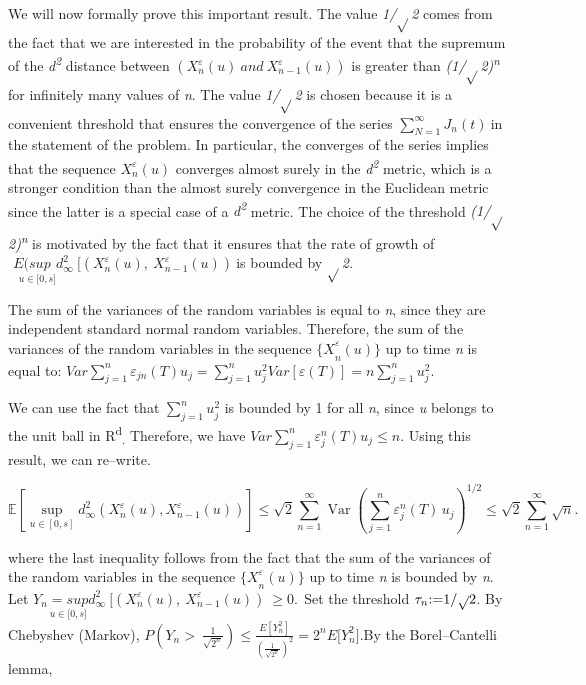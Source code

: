 \documentclass[12pt,a4paper]{report}
\numberwithin{equation}{section}
\begin{document}
We will now formally prove this important result. The value \emph{1/$\sqrt{}$2}
comes from the fact that we are interested in the probability of the
event that the supremum of the \emph{d\textsuperscript{2}} distance
between
\(\left( X_{n}^{\varepsilon}(u)\ and\ X_{n - 1}^{\varepsilon}(u) \right)\)
is greater than \emph{(1/$\sqrt{}$2)\textsuperscript{n}} for infinitely many
values of \emph{n}. The value \emph{1/$\sqrt{}$2} is chosen because it is a
convenient threshold that ensures the convergence of the series
\(\sum_{N = 1}^{\infty}{J_{n}(t)}\ \)in the statement of the problem. In
particular, the converges of the series implies that the sequence
\(X_{n}^{\varepsilon}(u)\) converges almost surely in the
\emph{d\textsuperscript{2}} metric, which is a stronger condition than
the almost surely convergence in the Euclidean metric since the latter
is a special case of a \emph{d\textsuperscript{2}} metric. The choice of
the threshold \emph{(1/$\sqrt{}$2)\textsuperscript{n}} is motivated by the fact
that it ensures that the rate of growth of
\(\underset{\ \ \ \ \ u \in \lbrack 0,s\rbrack}{E(sup}{d_{\infty}^{2}\ \lbrack\left( X_{n}^{\varepsilon}(u),\ X_{n - 1}^{\varepsilon}(u) \right)\ }\)is
bounded by \emph{$\sqrt{}$2.} 

The sum of the variances of the random variables is equal to \emph{n},
since they are independent standard normal random variables. Therefore,
the sum of the variances of the random variables in the sequence
\({\{ X}_{n}^{\varepsilon}(u)\}\) up to time \emph{n} is equal to:
\(Var\sum_{j = 1}^{n}{\varepsilon_{jn}(T)u_{j} = \sum_{j = 1}^{n}u_{j}^{2}Var\left\lbrack \varepsilon(T) \right\rbrack = n\sum_{j = 1}^{n}u_{j}^{2}}\).

We can use the fact that \(\sum_{j = 1}^{n}u_{j}^{2}\) is bounded by 1
for all \emph{n}, since \emph{u} belongs to the unit ball in
R\textsuperscript{d}\textsubscript{.} Therefore, we have
\(Var\sum_{j = 1}^{n}{\varepsilon_{j}^{n}(T)u_{j} \leq n}\). Using this
result, we can re--write.

\[
\mathbb{E}\!\left[\sup_{u\in[0,s]}
d_{\infty}^{2}\!\left(X_{n}^{\varepsilon}(u),X_{n-1}^{\varepsilon}(u)\right)\right]
\le \sqrt{2}\sum_{n=1}^{\infty}
\operatorname{Var}\!\left(\sum_{j=1}^{n}\varepsilon_{j}^{n}(T)\,u_{j}\right)^{1/2}
\le \sqrt{2}\sum_{n=1}^{\infty}\sqrt{n}.
\]


where the last inequality follows from the fact that the sum of the
variances of the random variables in the sequence
\({\{ X}_{n}^{\varepsilon}(u)\}\) up to time \emph{n} is bounded by
\emph{n}.\\ Let
\(\underset{\ \ \ \ \ \ \ u \in \lbrack 0,s\rbrack}{Y_{n} = sup}{d_{\infty}^{2}\ \lbrack\left( X_{n}^{\varepsilon}(u),\ X_{n - 1}^{\varepsilon}(u) \right)\  \geq 0.\ }\ \)Set
the threshold \(\tau_{n} $:=$ 1/\sqrt{}2\). By Chebyshev (Markov),
\(P\left( Y_{n} > \ \frac{1}{\sqrt{2^{n}}} \right) \leq \frac{E\left\lbrack Y_{n}^{2} \right\rbrack}{\left( \frac{1}{\sqrt{2^{n}}} \right)^{2}} = 2^{n}E\lbrack Y_{n}^{2}\rbrack\).By
the Borel--Cantelli lemma,
\end{document}
